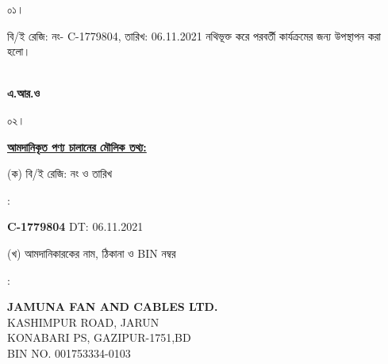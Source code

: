 \documentclass[12pt]{article}
\newcommand{\beno}{C-1779804}
\newcommand{\bedt}{06.11.2021}
\newcommand{\jfcl}{JAMUNA FAN AND CABLES LTD.}
\newcommand{\jfcla}{KASHIMPUR ROAD, JARUN
\\
KONABARI PS, GAZIPUR-1751,BD}
\newcommand{\impn}{\jfcl}
\newcommand{\impadd}{\jfcla}
\newcommand{\impbin}{001753334-0103}
\begin{document}
\noindent
\begin{minipage}[t]{0.05\linewidth}
০১।
\end{minipage}
\begin{minipage}[t]{0.95\linewidth}
বি/ই রেজি: নং- {\beno}, তারিখ: {\bedt}
নথিভূক্ত করে পরবর্তী কার্যক্রমের জন্য উপস্থাপন করা হলো।
\
\\
\\
\end{minipage}
\begin{minipage}[t]{0.05\linewidth}
\hspace*{1em}
\end{minipage}
\begin{minipage}[t]{0.45\linewidth}
\hspace*{1em}
\end{minipage}
\begin{minipage}[t]{0.50\linewidth}
\textbf{এ.আর.ও}
\end{minipage}
\begin{minipage}[t]{0.05\linewidth}
০২।
\end{minipage}
\begin{minipage}[t]{0.95\linewidth}
\underline{\textbf {আমদানিকৃত পণ্য চালানের
মৌলিক তথ্য:}}
\\
\end{minipage}
\footnotesize
\begin{minipage}[t]{0.05\linewidth}
\hspace*{1em}
\end{minipage}
\begin{minipage}[t]{0.45\linewidth}
(ক) বি/ই রেজি: নং ও তারিখ
\end{minipage}
\begin{minipage}[t]{0.02\linewidth}
:
\end{minipage}
\begin{minipage}[t]{0.50\linewidth}
\textbf{{\beno}} \hspace{2em} DT: {\bedt}
\\
\end{minipage}
\begin{minipage}[t]{0.05\linewidth}
\hspace*{1em}
\end{minipage}
\begin{minipage}[t]{0.45\linewidth}
(খ) আমদানিকারকের নাম, ঠিকানা
ও BIN নম্বর
\end{minipage}
\begin{minipage}[t]{0.02\linewidth}
:
\end{minipage}
\begin{minipage}[t]{0.50\linewidth}
\textbf{{\impn}}
\\
{\impadd}
\\
BIN NO. {\impbin}
\\
\end{minipage}
\end{document}
